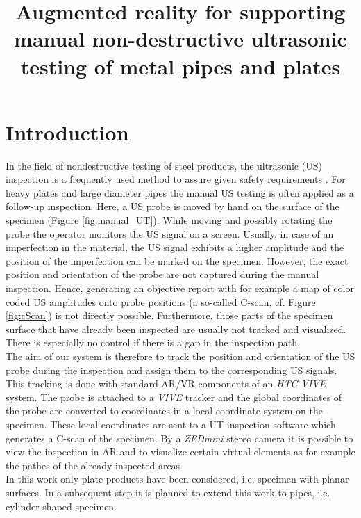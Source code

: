 \documentclass{VRARWorkshop}
\title{Augmented reality for supporting manual non-destructive ultrasonic testing of metal pipes and plates}
\begin{document}
\section{Introduction}

In the field of nondestructive testing of steel products, the ultrasonic (US) inspection is a frequently used method to assure given safety requirements \cite{deutsch_zfp_2010} \cite{moles_introduction_2004} 
\cite{olympus_Grundlagen}. 
For heavy plates and large diameter pipes the manual US testing is often applied as a follow-up inspection. Here, a US probe is moved by hand on the surface of the specimen (Figure \ref{fig:manual_UT}). While moving and possibly rotating the probe the operator monitors the US signal on a screen. Usually, in case of an imperfection in the material, the US signal exhibits a higher amplitude and the position of the imperfection can be marked on the specimen.
However, the exact position and orientation of the probe are not captured during the manual inspection. Hence, generating an objective report with for example a map of color coded US amplitudes onto probe positions (a so-called C-scan, cf. Figure \ref{fig:cScan}) is not directly possible. 
Furthermore, those parts of the specimen surface that have already been inspected are usually not tracked and visualized.
There is especially no control if there is a gap in the inspection path. \\
The aim of our system is therefore to track the position and orientation of the US probe during the inspection and assign them to the corresponding US signals. This tracking is done with standard AR/VR components of an \textit{HTC VIVE} system. The probe is attached to a \textit{VIVE} tracker and the global coordinates of the probe are converted to coordinates in a local coordinate system on the specimen. These local coordinates are sent to a UT inspection software which generates a C-scan of the specimen. 
By a \textit{ZEDmini} stereo camera it is possible to view the inspection in AR and to visualize certain virtual elements as for example the pathes of the already inspected areas. \\
In this work only plate products have been considered, i.e. specimen with planar surfaces. In a subsequent step it is planned to extend this work to pipes, i.e. cylinder shaped specimen.
\end{document}
